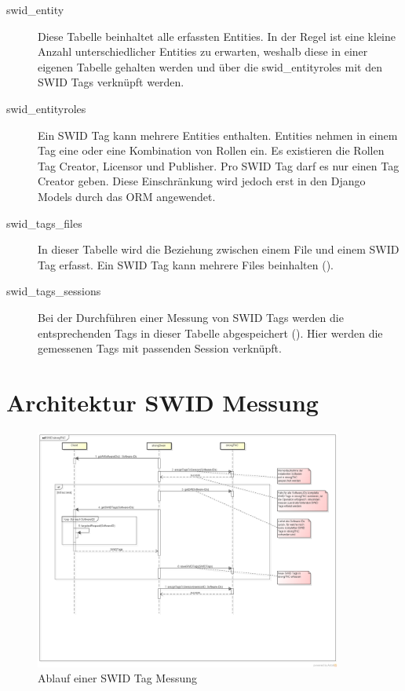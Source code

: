 \begin{description}
	
	\item[swid\_entity] Diese Tabelle beinhaltet alle erfassten Entities. In der
	Regel ist eine kleine Anzahl unterschiedlicher Entities zu erwarten, weshalb
	diese in einer eigenen Tabelle gehalten werden und über die swid\_entityroles
	mit den SWID Tags verknüpft werden.

	\item [swid\_entityroles] Ein SWID Tag kann mehrere Entities enthalten.
	Entities nehmen in einem Tag eine oder eine Kombination von Rollen ein. Es
	existieren die Rollen Tag Creator, Licensor und Publisher. Pro SWID Tag darf es
	nur einen Tag Creator geben. Diese Einschränkung wird jedoch erst in den Django
	Models durch das ORM angewendet.

	\item [swid\_tags\_files] In dieser Tabelle wird die Beziehung zwischen einem
	File und einem SWID Tag erfasst. Ein SWID Tag kann mehrere Files beinhalten
	().

	\item[swid\_tags\_sessions] Bei der Durchführen einer Messung von SWID Tags
	werden die entsprechenden Tags in dieser Tabelle abgespeichert
	(). Hier werden die gemessenen Tags mit passenden
	Session verknüpft.

\end{description}


\section{Architektur SWID Messung}

\begin{figure}[H]
	\centering
	\includegraphics[width=0.9\textwidth]{./images/architecture/SWID_strongTNC.png}
	\caption{Ablauf einer SWID Tag Messung}
	\label{fig:swid-measurement}
\end{figure}

